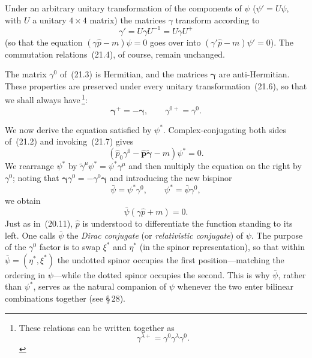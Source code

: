 Under an arbitrary unitary transformation of the components of $\psi$ ($\psi' = U\psi$, with $U$ a unitary $4\times 4$ matrix) the matrices $\gamma$ transform according to
\begin{equation}
\gamma' = U\gamma U^{-1} = U\gamma U^+
\tag{21.6}
\end{equation}
(so that the equation $(\gamma\widehat p - m)\psi = 0$ goes over into $(\gamma'\widehat p - m)\psi' = 0$). The commutation relations~(21.4), of course, remain unchanged.

The matrix $\gamma^0$ of~(21.3) is Hermitian, and the matrices $\boldsymbol{\gamma}$ are anti-Hermitian. These properties are preserved under every unitary transformation~(21.6), so that we shall always have\,\footnote{These relations can be written together as
\begin{equation}
\gamma^{\lambda+} = \gamma^0\gamma^\lambda\gamma^0.
\tag{21.7\,a}
\end{equation}}:
\begin{equation}
\boldsymbol{\gamma}^+ = -\boldsymbol{\gamma},\qquad \gamma^{0+} = \gamma^0.
\tag{21.7}
\end{equation}

We now derive the equation satisfied by $\psi^*$. Complex-conjugating both sides of~(21.2) and invoking~(21.7) gives
\[
(\widehat p_0\gamma^0 - \widehat{\mathbf{p}}\widetilde{\boldsymbol{\gamma}} - m)\psi^* = 0.
\]
We rearrange $\psi^*$ by $\widetilde\gamma^\mu\psi^* = \psi^*\gamma^\mu$ and then multiply the equation on the right by $\gamma^0$; noting that $\boldsymbol{\gamma}\gamma^0 = -\gamma^0\boldsymbol{\gamma}$ and introducing the new bispinor
\begin{equation}
\bar\psi = \psi^*\gamma^0,\qquad \psi^* = \bar\psi\gamma^0,
\tag{21.8}
\end{equation}
we obtain
\begin{equation}
\bar\psi(\gamma\widehat p + m) = 0.
\tag{21.9}
\end{equation}
Just as in~(20.11), $\widehat p$ is understood to differentiate the function standing to its left. One calls $\bar\psi$ the \emph{Dirac conjugate} (or \emph{relativistic conjugate}) of $\psi$. The purpose of the $\gamma^0$ factor is to swap $\xi^*$ and $\eta^*$ (in the spinor representation), so that within $\bar\psi = (\eta^*, \xi^*)$ the undotted spinor occupies the first position---matching the ordering in $\psi$---while the dotted spinor occupies the second. This is why $\bar\psi$, rather than $\psi^*$, serves as the natural companion of $\psi$ whenever the two enter bilinear combinations together (see \S\,28).

